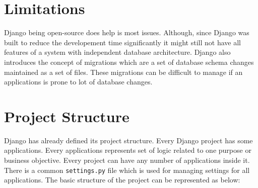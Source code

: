 \section{Limitations}
Django being open-source does help is most issues. Although, since Django was
built to reduce the developement time significantly it might still not have
all features of a system with independent database architecture. Django also
introduces the concept of migrations which are a set of database schema changes
maintained as a set of files. These migrations can be difficult to manage if
an applications is prone to lot of database changes.

\section{Project Structure}
Django has already defined its project structure. Every Django project has some
applications. Every applications represents set of logic related to one purpose
or business objective. Every project can have any number of applications inside
it. There is a common \texttt{settings.py} file which is used for managing
settings for all applications. The basic structure of the project can be
represented as below:

